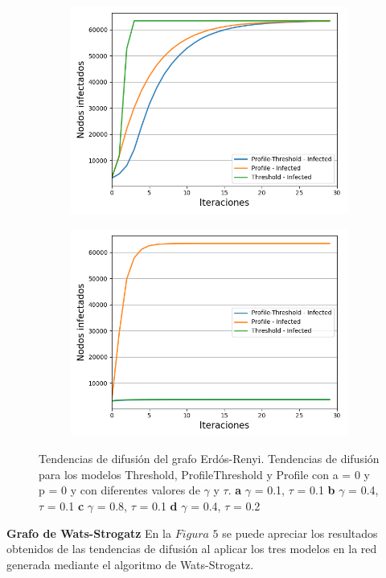 \documentclass{article}
\begin{document}
\begin{figure}[!tbp]
\begin{subfigure}[b]{0.5\textwidth}
		\includegraphics[width=\textwidth]{../Images/Fig 2 c).png}
		\caption{}
		\label{fig:f23}
	\end{subfigure}
	\hfill
	\begin{subfigure}[b]{0.5\textwidth}
		\includegraphics[width=\textwidth]{../Images/Fig 2 d).png}
		\caption{}
		\label{fig:f24}
	\end{subfigure}
	\label{fig:FIG2}
	\caption{Tendencias de difusión del grafo Erdós-Renyi. Tendencias de difusión para los modelos Threshold, ProfileThreshold y Profile con a = 0 y p = 0 y con diferentes valores de $\gamma$ y $\tau$. \textbf{a} $\gamma$ = 0.1, $\tau$ = 0.1 \textbf{b} $\gamma$ = 0.4, $\tau$ = 0.1 \textbf{c} $\gamma$ = 0.8, $\tau$ = 0.1 \textbf{d} $\gamma$ = 0.4, $\tau$ = 0.2}
\end{figure}
\newpage
\textbf{Grafo de Wats-Strogatz}
En la $Figura$ $5$ se puede apreciar los resultados obtenidos de las tendencias de difusión al aplicar los tres modelos en la red generada mediante el algoritmo de Wats-Strogatz. 
\end{document}

